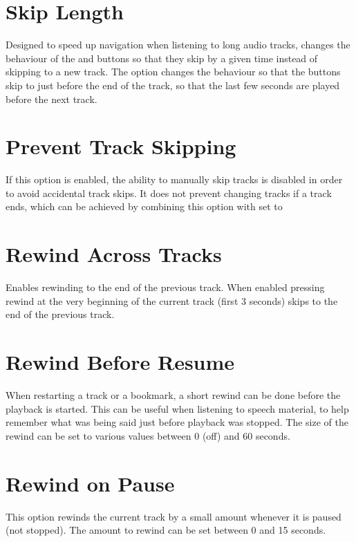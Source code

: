 \section{Skip Length}
  Designed to speed up navigation when listening to long audio tracks,
   changes the behaviour of
  the \ActionWpsSkipPrev{} and \ActionWpsSkipNext{} buttons so that they skip
  by a given time instead of skipping to a new track.
  The  option changes the behaviour so that the buttons
  skip to just before the end of the track, so that the last few seconds are
  played before the next track.

\section{Prevent Track Skipping}
  If this option is enabled, the ability to manually skip tracks is disabled
  in order to avoid accidental track skips. It does not prevent changing tracks
  if a track ends, which can be achieved by combining this option with
   set to 

\section{Rewind Across Tracks}
  Enables rewinding to the end of the previous track. When enabled pressing rewind
  at the very beginning of the current track (first 3 seconds) skips to the end of
  the previous track.

\section{Rewind Before Resume}
  When restarting a track or a bookmark, a short rewind can be done before the
  playback is started. This can be useful when listening to speech material,
  to help remember what was being said just before playback was stopped.
  The size of the rewind can be set to various values between 0 (off) and
  60 seconds.

\section{Rewind on Pause}
  This option rewinds the current track by a small amount whenever it is
  paused (not stopped).  The amount to rewind can be set between 0 and
  15 seconds.

